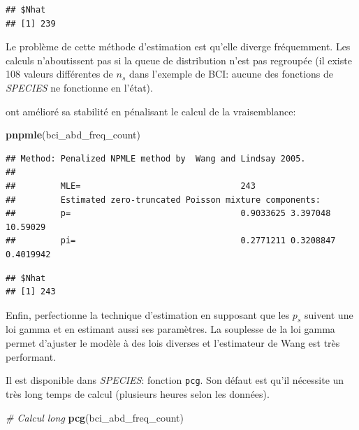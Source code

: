 \documentclass[
  11pt,
  american,
  a4paper,
  extrafontsizes,onecolumn,openright
  ]{memoir}
\newenvironment{Shaded}{\begin{snugshade}}{\end{snugshade}}
\newcommand{\CommentTok}[1]{\textcolor[rgb]{0.56,0.35,0.01}{\textit{#1}}}
\newcommand{\FunctionTok}[1]{\textcolor[rgb]{0.13,0.29,0.53}{\textbf{#1}}}
\newcommand{\NormalTok}[1]{#1}
\newlength{\rf}
\begin{document}
\begin{verbatim}
## $Nhat
## [1] 239
\end{verbatim}

\normalsize

Le problème de cette méthode d'estimation est qu'elle diverge fréquemment.
Les calculs n'aboutissent pas si la queue de distribution n'est pas regroupée (il existe 108 valeurs différentes de \(n_s\) dans l'exemple de BCI: aucune des fonctions de \emph{SPECIES} ne fonctionne en l'état).

\textcite{Wang2005} ont amélioré sa stabilité en pénalisant le calcul de la vraisemblance:

\scriptsize

\begin{Shaded}
\begin{Highlighting}[]
\FunctionTok{pnpmle}\NormalTok{(bci\_abd\_freq\_count)}
\end{Highlighting}
\end{Shaded}

\begin{verbatim}
## Method: Penalized NPMLE method by  Wang and Lindsay 2005. 
## 
##         MLE=                                243 
##         Estimated zero-truncated Poisson mixture components:       
##         p=                                  0.9033625 3.397048 10.59029 
##         pi=                                 0.2771211 0.3208847 0.4019942
\end{verbatim}

\begin{verbatim}
## $Nhat
## [1] 243
\end{verbatim}

\normalsize

Enfin, \textcite{Wang2010} perfectionne la technique d'estimation en supposant que les \(p_s\) suivent une loi gamma et en estimant aussi ses paramètres.
La souplesse de la loi gamma permet d'ajuster le modèle à des lois diverses et l'estimateur de Wang est très performant.

Il est disponible dans \emph{SPECIES}: fonction \texttt{pcg}.
Son défaut est qu'il nécessite un très long temps de calcul (plusieurs heures selon les données).

\scriptsize

\begin{Shaded}
\begin{Highlighting}[]
\CommentTok{\# Calcul long}
\FunctionTok{pcg}\NormalTok{(bci\_abd\_freq\_count)}
\end{Highlighting}
\end{Shaded}
\end{document}
